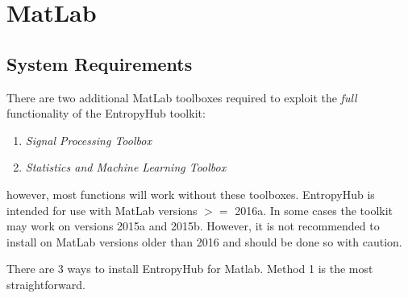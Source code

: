 \documentclass[12pt, a4paper, titlepage, openany]{book}
\begin{document}
\section{\textbf{MatLab}}
\subsection*{\normalsize System Requirements}
\noindent There are two additional MatLab toolboxes required to exploit the \textit{full} functionality of the EntropyHub toolkit: \begin{enumerate}
\item[] \emph{Signal Processing Toolbox}
\item[] \emph{Statistics and Machine Learning Toolbox}
\end{enumerate}  
however, most functions will work without these toolboxes.\newline
EntropyHub is intended for use with MatLab versions $>=$ 2016a.  In some cases the toolkit may work on versions 2015a and 2015b. However, it is not recommended to install on MatLab versions older than 2016 and should be done so with caution.



\noindent There are 3 ways to install EntropyHub for Matlab. Method 1 is the most straightforward.
\end{document}
